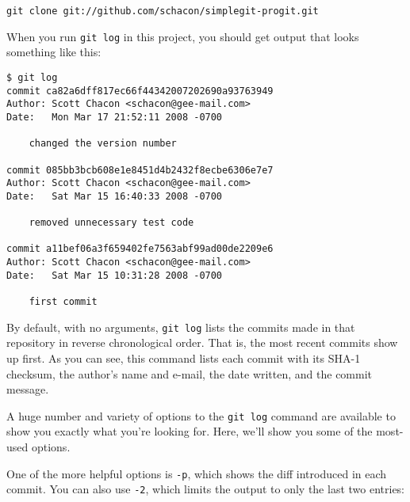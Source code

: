\documentclass[a4paper]{book}
\begin{document}
\begin{shaded}\begin{verbatim}
git clone git://github.com/schacon/simplegit-progit.git
\end{verbatim}\end{shaded}

When you run \texttt{git log} in this project, you should get output that looks something like this:

\begin{shaded}\begin{verbatim}
$ git log
commit ca82a6dff817ec66f44342007202690a93763949
Author: Scott Chacon <schacon@gee-mail.com>
Date:   Mon Mar 17 21:52:11 2008 -0700

    changed the version number

commit 085bb3bcb608e1e8451d4b2432f8ecbe6306e7e7
Author: Scott Chacon <schacon@gee-mail.com>
Date:   Sat Mar 15 16:40:33 2008 -0700

    removed unnecessary test code

commit a11bef06a3f659402fe7563abf99ad00de2209e6
Author: Scott Chacon <schacon@gee-mail.com>
Date:   Sat Mar 15 10:31:28 2008 -0700

    first commit
\end{verbatim}\end{shaded}

By default, with no arguments, \texttt{git log} lists the commits made in that repository in reverse chronological order. That is, the most recent commits show up first. As you can see, this command lists each commit with its SHA-1 checksum, the author's name and e-mail, the date written, and the commit message.

A huge number and variety of options to the \texttt{git log} command are available to show you exactly what you're looking for. Here, we'll show you some of the most-used options.

One of the more helpful options is \texttt{-p}, which shows the diff introduced in each commit. You can also use \texttt{-2}, which limits the output to only the last two entries:
\end{document}
